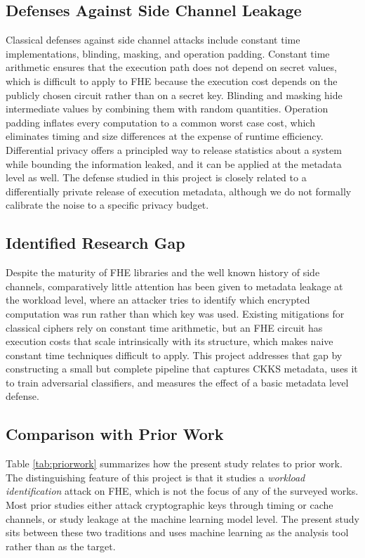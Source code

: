\documentclass[12pt,a4paper]{article}
\begin{document}
\subsection{Defenses Against Side Channel Leakage}
Classical defenses against side channel attacks include constant time implementations, blinding, masking, and operation padding. Constant time arithmetic ensures that the execution path does not depend on secret values, which is difficult to apply to FHE because the execution cost depends on the publicly chosen circuit rather than on a secret key. Blinding and masking hide intermediate values by combining them with random quantities. Operation padding inflates every computation to a common worst case cost, which eliminates timing and size differences at the expense of runtime efficiency. Differential privacy \cite{dwork2014algorithmic} offers a principled way to release statistics about a system while bounding the information leaked, and it can be applied at the metadata level as well. The defense studied in this project is closely related to a differentially private release of execution metadata, although we do not formally calibrate the noise to a specific privacy budget.

\subsection{Identified Research Gap}
Despite the maturity of FHE libraries and the well known history of side channels, comparatively little attention has been given to metadata leakage at the workload level, where an attacker tries to identify which encrypted computation was run rather than which key was used. Existing mitigations for classical ciphers rely on constant time arithmetic, but an FHE circuit has execution costs that scale intrinsically with its structure, which makes naive constant time techniques difficult to apply. This project addresses that gap by constructing a small but complete pipeline that captures CKKS metadata, uses it to train adversarial classifiers, and measures the effect of a basic metadata level defense.

\subsection{Comparison with Prior Work}
Table \ref{tab:priorwork} summarizes how the present study relates to prior work. The distinguishing feature of this project is that it studies a \emph{workload identification} attack on FHE, which is not the focus of any of the surveyed works. Most prior studies either attack cryptographic keys through timing or cache channels, or study leakage at the machine learning model level. The present study sits between these two traditions and uses machine learning as the analysis tool rather than as the target.
\end{document}
